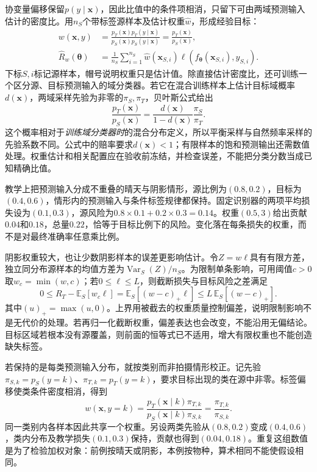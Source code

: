协变量偏移保留$p(y\mid\bm{x})$，因此比值中的条件项相消，只留下可由两域预测输入估计的密度比。用$n_S$个带标签源样本及估计权重$\hat w$，形成经验目标：
\begin{equation}
\begin{aligned}
w(\bm{x},y)
&=\frac{p_T(\bm{x})p_T(y\mid\bm{x})}
       {p_S(\bm{x})p_S(y\mid\bm{x})}
=\frac{p_T(\bm{x})}{p_S(\bm{x})},\\
\hat R_w(\bm{\theta})
&=\frac{1}{n_S}\sum_{i=1}^{n_S}
\hat w(\bm{x}_{S,i})\ell(f_{\bm{\theta}}(\bm{x}_{S,i}),y_{S,i}).
\end{aligned}
\label{eq:ket-update-covariate}
\end{equation}
下标$S,i$标记源样本，帽号说明权重只是估计值。除直接估计密度比，还可训练一个区分源、目标预测输入的域分类器。若它在混合训练样本上估计目标域概率$d(\bm{x})$，两域采样先验为非零的$\pi_S,\pi_T$，贝叶斯公式给出
\[
\frac{p_T(\bm{x})}{p_S(\bm{x})}
=\frac{d(\bm{x})}{1-d(\bm{x})}\frac{\pi_S}{\pi_T}.
\]
这个概率相对于\emph{训练域分类器时}的混合分布定义，所以平衡采样与自然频率采样的先验系数不同。公式中的赔率要求$d(\bm{x})<1$；有限样本的饱和预测输出还需数值处理。权重估计和相关配置应在验收前冻结，并检查误差，不能把分类分数当成已知精确比值。

教学上把预测输入分成不重叠的晴天与阴影情形，源比例为$(0.8,0.2)$，目标为$(0.4,0.6)$，情形内的预测输入与条件标签规律都保持。固定识别器的两项平均损失设为$(0.1,0.3)$，源风险为$0.8\times0.1+0.2\times0.3=0.14$。权重$(0.5,3)$给出贡献$0.04$和$0.18$，总量$0.22$，恰等于目标比例下的风险。变化落在每条损失的权重，而不是对最终准确率任意乘比例。

阴影权重较大，也让少数阴影样本的误差更影响估计。令$Z=w\ell$具有有限方差，独立同分布源样本的均值方差为$\operatorname{Var}_S(Z)/n_S$。为限制单条影响，可用阈值$c>0$取$w_c=\min(w,c)$；若$0\leq\ell\leq L$，则截断损失与目标风险之差满足
\[
0\le R_T-\mathbb E_S[w_c\ell]
=\mathbb E_S[(w-c)_+\ell]
\le L\,\mathbb E_S[(w-c)_+].
\]
其中$(u)_+=\max(u,0)$。上界用被截去的权重质量控制偏差，说明限制影响不是无代价的处理。若再归一化截断权重，偏差表达也会改变，不能沿用无偏结论。目标区域若根本没有源覆盖，则前面的恒等式已不适用，增大有限权重也不能创造缺失标签。

若保持的是每类预测输入分布，就按类别而非拍摄情形校正。记先验$\pi_{S,k}=p_S(y=k)$、$\pi_{T,k}=p_T(y=k)$，要求目标出现的类在源中非零。标签偏移使类条件密度相消，得到
\begin{equation}
w(\bm{x},y=k)
=\frac{p_T(\bm{x}\mid k)\pi_{T,k}}
       {p_S(\bm{x}\mid k)\pi_{S,k}}
=\frac{\pi_{T,k}}{\pi_{S,k}}.
\label{eq:ket-update-label-weight}
\end{equation}
同一类别内各样本因此共享一个权重。另设两类先验从$(0.8,0.2)$变成$(0.4,0.6)$，类内分布及教学损失$(0.1,0.3)$保持，贡献也得到$(0.04,0.18)$。重复这组数值是为了检验加权对象：前例按晴天或阴影，本例按物种，算术相同不能使假设相同。

